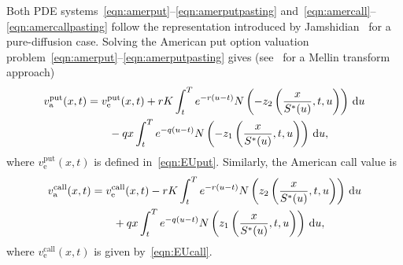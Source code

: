 Both PDE systems~\eqref{eqn:amerput}--\eqref{eqn:amerputpasting} and~\eqref{eqn:amercall}--\eqref{eqn:amercallpasting}  follow the representation introduced by Jamshidian~\cite{Jamshidian1992} for a pure-diffusion case. Solving the American put option valuation problem~\eqref{eqn:amerput}--\eqref{eqn:amerputpasting} gives (see~\cite{Rodrigo2013} for a Mellin transform approach)
	\begin{equation}
		\label{eqn:americanput}
		\begin{split}
			v_\text{a}^{\text{put}}(x,t) &= v_\text{e}^{\text{put}}(x,t) + rK\int_t^T e^{-r(u-t)}N\left( -z_2\left( \frac{x}{S^*(u)},t,u \right) \right) \, \mathrm d u \\
			& \qquad - qx\int_t^T e^{-q(u-t)}N\left( -z_1\left( \frac{x}{S^*(u)},t,u \right) \right) \, \mathrm d u,
		\end{split}
	\end{equation}
where $v_\text{e}^{\text{put}}(x,t)$ is defined in~\eqref{eqn:EUput}. Similarly, the American call value is
	\begin{equation}
		\label{eqn:americancall}
		\begin{split}
			v_\text{a}^{\text{call}}(x,t) &= v_\text{e}^{\text{call}}(x,t) - rK\int_t^T e^{-r(u-t)}N\left( z_2\left( \frac{x}{S^*(u)},t,u \right) \right) \, \mathrm d u \\
			& \qquad + qx\int_t^T e^{-q(u-t)}N\left( z_1\left( \frac{x}{S^*(u)},t,u \right) \right) \, \mathrm d u,
		\end{split}
	\end{equation}
where $v_\text{e}^{\text{call}}(x,t)$ is given by~\eqref{eqn:EUcall}.

